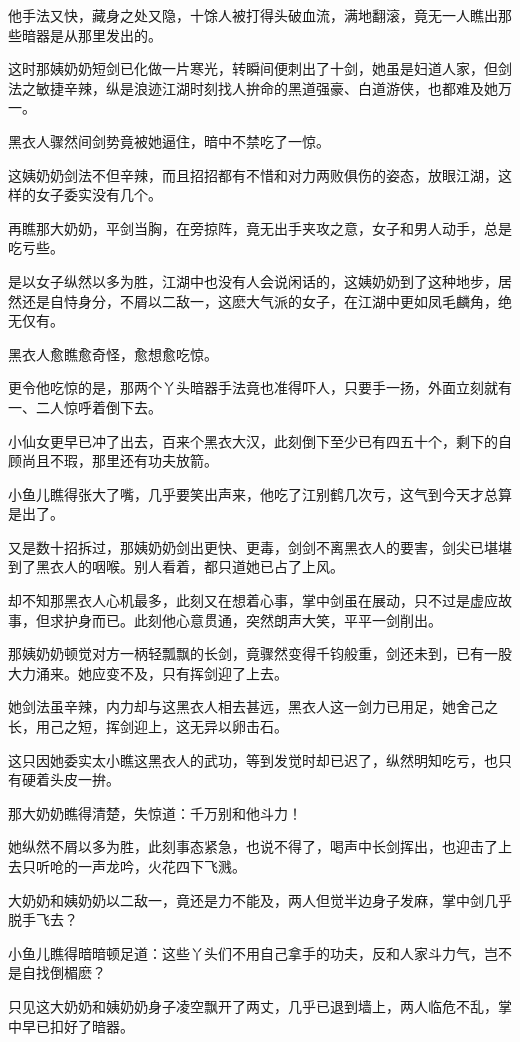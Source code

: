 \documentclass[12pt,oneside]{book}
\begin{document}
他手法又快，藏身之处又隐，十馀人被打得头破血流，满地翻滚，竟无一人瞧出那些暗器是从那里发出的。

这时那姨奶奶短剑已化做一片寒光，转瞬间便刺出了十剑，她虽是妇道人家，但剑法之敏捷辛辣，纵是浪迹江湖时刻找人拚命的黑道强豪、白道游侠，也都难及她万一。

黑衣人骤然间剑势竟被她逼住，暗中不禁吃了一惊。

这姨奶奶剑法不但辛辣，而且招招都有不惜和对力两败俱伤的姿态，放眼江湖，这样的女子委实没有几个。

再瞧那大奶奶，平剑当胸，在旁掠阵，竟无出手夹攻之意，女子和男人动手，总是吃亏些。

是以女子纵然以多为胜，江湖中也没有人会说闲话的，这姨奶奶到了这种地步，居然还是自恃身分，不屑以二敌一，这麽大气派的女子，在江湖中更如凤毛麟角，绝无仅有。

黑衣人愈瞧愈奇怪，愈想愈吃惊。

更令他吃惊的是，那两个丫头暗器手法竟也准得吓人，只要手一扬，外面立刻就有一、二人惊呼着倒下去。

小仙女更早已冲了出去，百来个黑衣大汉，此刻倒下至少已有四五十个，剩下的自顾尚且不瑕，那里还有功夫放箭。

小鱼儿瞧得张大了嘴，几乎要笑出声来，他吃了江别鹤几次亏，这气到今天才总算是出了。

又是数十招拆过，那姨奶奶剑出更快、更毒，剑剑不离黑衣人的要害，剑尖已堪堪到了黑衣人的咽喉。别人看着，都只道她已占了上风。

却不知那黑衣人心机最多，此刻又在想着心事，掌中剑虽在展动，只不过是虚应故事，但求护身而已。此刻他心意贯通，突然朗声大笑，平平一剑削出。

那姨奶奶顿觉对方一柄轻瓢飘的长剑，竟骤然变得千钧般重，剑还未到，已有一股大力涌来。她应变不及，只有挥剑迎了上去。

她剑法虽辛辣，内力却与这黑衣人相去甚远，黑衣人这一剑力已用足，她舍己之长，用己之短，挥剑迎上，这无异以卵击石。

这只因她委实太小瞧这黑衣人的武功，等到发觉时却已迟了，纵然明知吃亏，也只有硬着头皮一拚。

那大奶奶瞧得清楚，失惊道：千万别和他斗力！

她纵然不屑以多为胜，此刻事态紧急，也说不得了，喝声中长剑挥出，也迎击了上去只听呛的一声龙吟，火花四下飞溅。

大奶奶和姨奶奶以二敌一，竟还是力不能及，两人但觉半边身子发麻，掌中剑几乎脱手飞去？

小鱼儿瞧得暗暗顿足道：这些丫头们不用自己拿手的功夫，反和人家斗力气，岂不是自找倒楣麽？

只见这大奶奶和姨奶奶身子凌空飘开了两丈，几乎已退到墙上，两人临危不乱，掌中早已扣好了暗器。
\end{document}
